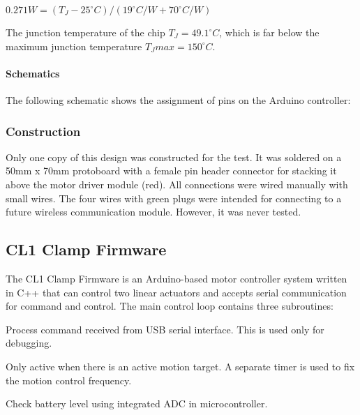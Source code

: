 $0.271W = (T_J - 25^{\circ}C) / (19^{\circ}C/W + 70^{\circ}C/W)$

The junction temperature of the chip $T_J = 49.1^{\circ}C$, which is far below the maximum junction temperature $T_J{max} = 150^{\circ}C$.

\paragraph{Schematics}

The following schematic shows the assignment of pins on the Arduino controller:

\subsubsection{Construction}
\label{subsubsection:exploration_1_construction}

Only one copy of this design was constructed for the test. It was soldered on a 50mm x 70mm protoboard with a female pin header connector for stacking it above the motor driver module (red). All connections were wired manually with small wires. The four wires with green plugs were intended for connecting to a future wireless communication module. However, it was never tested.

\subsection{CL1 Clamp Firmware}
\label{subsection:exploration_1_cl1_firmware}

The CL1 Clamp Firmware is an Arduino-based motor controller system written in C++ that can control two linear actuators and accepts serial communication for command and control. The main control loop contains three subroutines:

\begin{description}[style=unboxed] %
    \item[Read and Process Serial Command] Process command received from USB serial interface. This is used only for debugging. 
    \item[Motor Motion Control] Only active when there is an active motion target. A separate timer is used to fix the motion control frequency. 
    \item[Battery Monitor] Check battery level using integrated ADC in microcontroller. 
\end{description}

